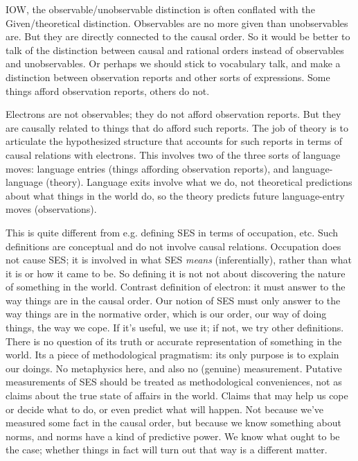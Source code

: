 \documentclass[11pt,twoside]{article}
\begin{document}
IOW, the observable/unobservable distinction is often conflated with
the Given/theoretical distinction.  Observables are no more given than
unobservables are.  But they are directly connected to the causal
order.  So it would be better to talk of the distinction between
causal and rational orders instead of observables and unobservables.
Or perhaps we should stick to vocabulary talk, and make a distinction
between observation reports and other sorts of expressions.  Some
things afford observation reports, others do not.

Electrons are not observables; they do not afford observation reports.
But they are causally related to things that do afford such reports.
The job of theory is to articulate the hypothesized structure that
accounts for such reports in terms of causal relations with electrons.
This involves two of the three sorts of language moves: language
entries (things affording observation reports), and language-language
(theory).  Language exits involve what we do, not theoretical
predictions about what things in the world do, so the theory predicts
future language-entry moves (observations).

This is quite different from e.g. defining SES in terms of occupation,
etc.  Such definitions are conceptual and do not involve causal
relations.  Occupation does not cause SES; it is involved in what SES
\textit{means} (inferentially), rather than what it is or how it came to
be.  So defining it is not not about discovering the nature of
something in the world.  Contrast definition of electron: it must
answer to the way things are in the causal order.  Our notion of SES
must only answer to the way things are in the normative order, which
is our order, our way of doing things, the way we cope.  If it's
useful, we use it; if not, we try other definitions.  There is no
question of its truth or accurate representation of something in the
world.  Its a piece of methodological pragmatism: its only purpose is
to explain our doings.  No metaphysics here, and also no (genuine)
measurement.  Putative measurements of SES should be treated as
methodological conveniences, not as claims about the true state of
affairs in the world.  Claims that may help us cope or decide what to
do, or even predict what will happen.  Not because we've measured some
fact in the causal order, but because we know something about norms,
and norms have a kind of predictive power.  We know what ought to be
the case; whether things in fact will turn out that way is a different
matter.
\end{document}
